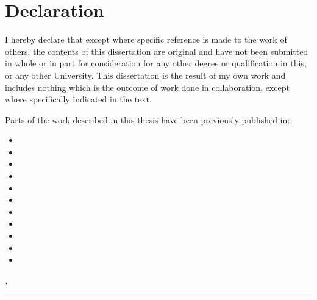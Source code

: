 %
\chapter*{Declaration}
\thispagestyle{empty}

I hereby declare that except where specific reference is made to the work of others, the contents of this dissertation are original and have not been submitted in whole or in part for consideration for any other degree or qualification in this, or any other University. This dissertation is the result of my own work and includes nothing which is the outcome of work done in collaboration, except where specifically indicated in the text.

Parts of the work described in this thesis have been previously published in:
\begin{itemize}
  \item {}
  \item {}
  \item {}
  \item {}
  \item {}
  \item {}
  \item {}
  \item {}
  \item {}
  \item {}
  \item {}
\end{itemize}

\bigskip

\noindent\textit{\thesisUniversityCity, \thesisDate}

\smallskip

\begin{flushright}
	\begin{minipage}{5cm}
		\rule{\textwidth}{1pt}
		\centering\thesisName{}
	\end{minipage}
\end{flushright}

